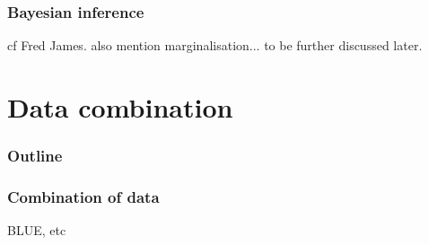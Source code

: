 \documentclass[9pt]{beamer}
\begin{document}
\begin{frame}
 \frametitle{Bayesian inference}
 
 cf Fred James. also mention marginalisation... to be further discussed later.
\end{frame}



\section{Data combination}

\begin{frame}
 \frametitle{Outline}
 
 \tableofcontents[current]
\end{frame}


\begin{frame}
 \frametitle{Combination of data}
 
 BLUE, etc
\end{frame}
\end{document}
